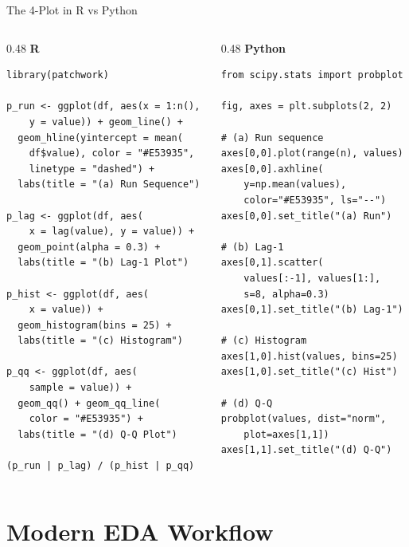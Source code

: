 \documentclass[10pt]{beamer}
\begin{document}
\begin{frame}[fragile]{The 4-Plot in R vs Python}
  \begin{columns}[T]
    \begin{column}{0.48\textwidth}
      \textbf{R}
\begin{lstlisting}[style=rstyle]
library(patchwork)

p_run <- ggplot(df, aes(x = 1:n(),
    y = value)) + geom_line() +
  geom_hline(yintercept = mean(
    df$value), color = "#E53935",
    linetype = "dashed") +
  labs(title = "(a) Run Sequence")

p_lag <- ggplot(df, aes(
    x = lag(value), y = value)) +
  geom_point(alpha = 0.3) +
  labs(title = "(b) Lag-1 Plot")

p_hist <- ggplot(df, aes(
    x = value)) +
  geom_histogram(bins = 25) +
  labs(title = "(c) Histogram")

p_qq <- ggplot(df, aes(
    sample = value)) +
  geom_qq() + geom_qq_line(
    color = "#E53935") +
  labs(title = "(d) Q-Q Plot")

(p_run | p_lag) / (p_hist | p_qq)
\end{lstlisting}
    \end{column}
    \begin{column}{0.48\textwidth}
      \textbf{Python}
\begin{lstlisting}[style=pythonstyle]
from scipy.stats import probplot

fig, axes = plt.subplots(2, 2)

# (a) Run sequence
axes[0,0].plot(range(n), values)
axes[0,0].axhline(
    y=np.mean(values),
    color="#E53935", ls="--")
axes[0,0].set_title("(a) Run")

# (b) Lag-1
axes[0,1].scatter(
    values[:-1], values[1:],
    s=8, alpha=0.3)
axes[0,1].set_title("(b) Lag-1")

# (c) Histogram
axes[1,0].hist(values, bins=25)
axes[1,0].set_title("(c) Hist")

# (d) Q-Q
probplot(values, dist="norm",
    plot=axes[1,1])
axes[1,1].set_title("(d) Q-Q")
\end{lstlisting}
    \end{column}
  \end{columns}
\end{frame}

\section{Modern EDA Workflow}
\end{document}
